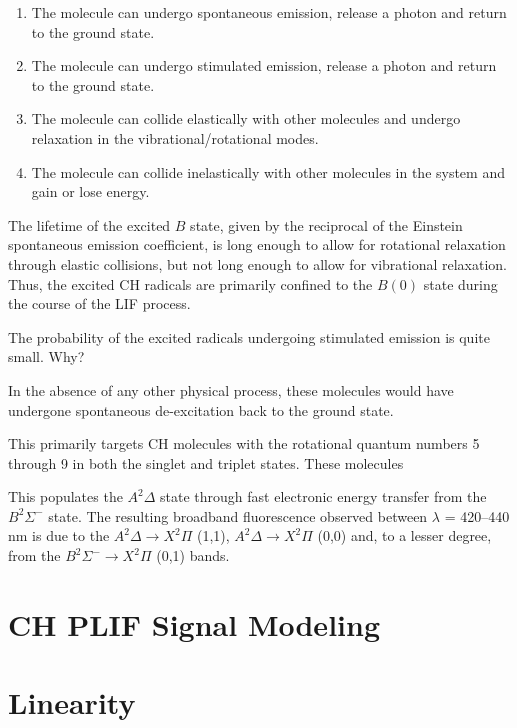 \begin{enumerate}
\item The molecule can undergo spontaneous emission, release a photon and return to the ground state.
\item The molecule can undergo stimulated emission, release a photon and return to the ground state.
\item The molecule can collide elastically with other molecules and undergo relaxation in the vibrational/rotational modes.
\item The molecule can collide inelastically with other molecules in the system and gain or lose energy.
\end{enumerate}

The lifetime of the excited \(B\) state, given by the reciprocal of the Einstein spontaneous emission coefficient, is long enough to allow for rotational relaxation through elastic collisions, but not long enough to allow for vibrational relaxation.
Thus, the excited CH radicals are primarily confined to the \(B(0)\) state during the course of the LIF process.

The probability of the excited radicals undergoing stimulated emission is quite small. Why?






In the absence of any other physical process, these molecules would have undergone spontaneous de-excitation back to the ground state.



This primarily targets CH molecules with the rotational quantum numbers 5 through 9 in both the singlet and triplet states.
These molecules

This populates the \(A^2\Delta\) state through fast electronic energy transfer from the \(B^2\Sigma^-\) state.
The resulting broadband fluorescence observed between \(\lambda\) = 420--440 nm is due to the \(A^2\Delta \rightarrow X^2\Pi\) (1,1), \(A^2\Delta \rightarrow X^2\Pi\) (0,0) and, to a lesser degree, from the \(B^2\Sigma^- \rightarrow X^2\Pi\) (0,1) bands.

\section{CH PLIF Signal Modeling}

\section{Linearity}

